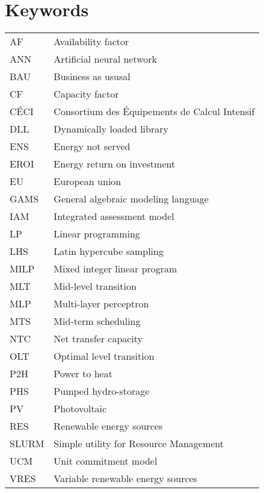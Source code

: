 \newpage

\tableofcontents

\newpage

\section*{Keywords}


\begin{table}[h!]
    \begin{tabular}{p{3cm} p{9cm}}
        AF & Availability factor \\
        ANN & Artificial neural network \\
        BAU & Business as ususal \\
        CF & Capacity factor \\
        CÉCI & Consortium des Équipements de Calcul Intensif \\
        DLL & Dynamically loaded library \\
        ENS & Energy not served \\
        EROI & Energy return on investment \\
        EU & European union \\
        GAMS & General algebraic modeling language \\
        IAM & Integrated assessment model \\
        LP & Linear programming \\
        LHS & Latin hypercube sampling \\
        MILP & Mixed integer linear program \\
        MLT & Mid-level transition \\
        MLP & Multi-layer perceptron \\
        MTS & Mid-term scheduling \\
        NTC & Net transfer capacity \\
        OLT & Optimal level transition \\
        P2H & Power to heat \\
        PHS & Pumped hydro-storage \\
        PV & Photovoltaic \\
        RES & Renewable energy sources \\
        SLURM & Simple utility for Resource Management \\
        UCM & Unit commitment model \\
        VRES & Variable renewable energy sources \\
    \end{tabular}
\end{table}

\newpage
